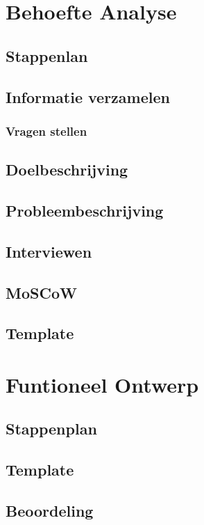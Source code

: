 \documentclass[a4paper,12pt,twoside,openright,titlepage]{book}
\begin{document}
\chapter{Behoefte Analyse}

\section{Stappenlan}

\section{Informatie verzamelen}

\subsection{Vragen stellen}

\section{Doelbeschrijving}

\section{Probleembeschrijving}

\section{Interviewen}

\section{MoSCoW}

\section{Template}


\chapter{Funtioneel Ontwerp}

\section{Stappenplan}

\section{Template}

\section{Beoordeling}

\end{document}
